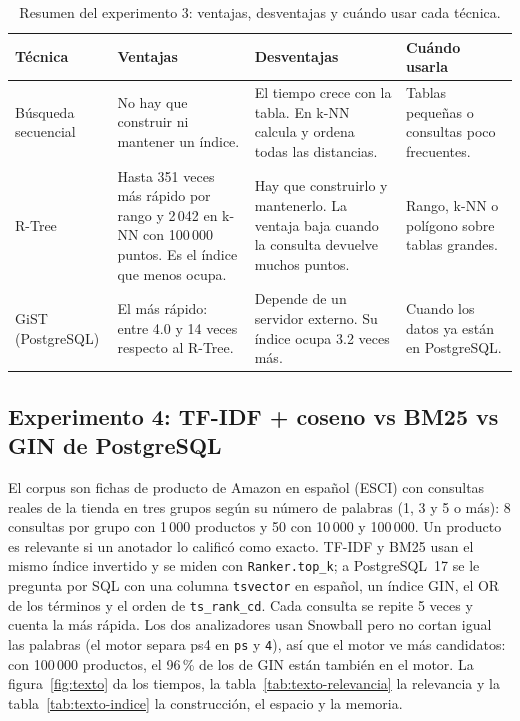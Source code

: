 \begin{table}[!htb]
\centering
\caption{Resumen del experimento 3: ventajas, desventajas y cuándo usar cada técnica.}\label{tab:resumen-espacial}
\small
\begin{tabular}{@{}L{2.4cm}L{4.6cm}L{4.6cm}L{4.2cm}@{}}
\toprule
\textbf{Técnica} & \textbf{Ventajas} & \textbf{Desventajas} & \textbf{Cuándo usarla} \\
\midrule
Búsqueda secuencial & No hay que construir ni mantener un índice. & El tiempo crece con la tabla. En k-NN calcula y ordena todas las distancias. & Tablas pequeñas o consultas poco frecuentes. \\
R-Tree & Hasta 351 veces más rápido por rango y 2\,042 en k-NN con 100\,000 puntos. Es el índice que menos ocupa. & Hay que construirlo y mantenerlo. La ventaja baja cuando la consulta devuelve muchos puntos. & Rango, k-NN o polígono sobre tablas grandes. \\
GiST (PostgreSQL) & El más rápido: entre 4.0 y 14 veces respecto al R-Tree. & Depende de un servidor externo. Su índice ocupa 3.2 veces más. & Cuando los datos ya están en PostgreSQL. \\
\bottomrule
\end{tabular}
\end{table}

\FloatBarrier
\subsection{Experimento 4: TF-IDF + coseno vs BM25 vs GIN de PostgreSQL}

El corpus son fichas de producto de Amazon en español (ESCI) con consultas reales de la
tienda en tres grupos según su número de palabras (1, 3 y 5 o más): 8 consultas por grupo
con 1\,000 productos y 50 con 10\,000 y 100\,000. Un producto es relevante si un anotador lo
calificó como exacto. TF-IDF y BM25 usan el mismo índice invertido y se miden con
\texttt{Ranker.top\_k}; a PostgreSQL~17 se le pregunta por SQL con una columna
\texttt{tsvector} en español, un índice GIN, el OR de los términos y el orden de
\texttt{ts\_rank\_cd}. Cada consulta se repite 5 veces y cuenta la más rápida. Los dos
analizadores usan Snowball pero no cortan igual las palabras (el motor separa \guillemotleft{}ps4\guillemotright{} en
\texttt{ps} y \texttt{4}), así que el motor ve más candidatos: con 100\,000 productos, el
96\,\% de los de GIN están también en el motor. La figura~\ref{fig:texto} da los tiempos, la tabla~\ref{tab:texto-relevancia} la relevancia
y la tabla~\ref{tab:texto-indice} la construcción, el espacio y la memoria.

